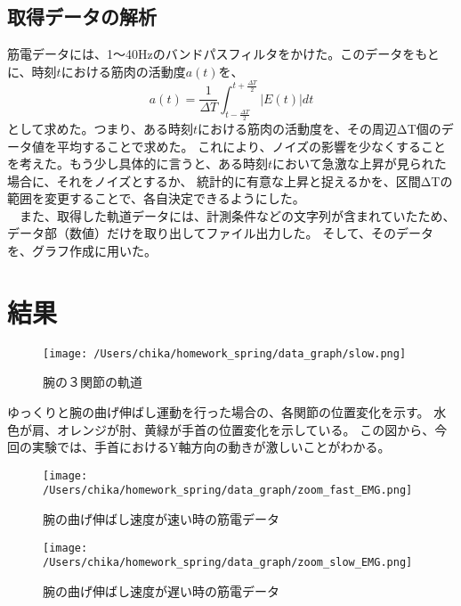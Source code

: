 \documentclass{jsarticle}
\begin{document}
\subsection{取得データの解析}
筋電データには、1〜40Hzのバンドパスフィルタをかけた。このデータをもとに、時刻$t$における筋肉の活動度$a(t)$を、
$$a(t) = \frac{1}{ΔT} \int_{t-\frac{ΔT}{2}}^{t+\frac{ΔT}{2}} |E(t)|dt $$
として求めた。つまり、ある時刻$t$における筋肉の活動度を、その周辺ΔT個のデータ値を平均することで求めた。
これにより、ノイズの影響を少なくすることを考えた。もう少し具体的に言うと、ある時刻$t$において急激な上昇が見られた場合に、それをノイズとするか、
統計的に有意な上昇と捉えるかを、区間ΔTの範囲を変更することで、各自決定できるようにした。\\
　また、取得した軌道データには、計測条件などの文字列が含まれていたため、データ部（数値）だけを取り出してファイル出力した。
そして、そのデータを、グラフ作成に用いた。

\clearpage
\section{結果}

\begin{figure}[h]
  \begin{center} %
    \texttt{[image: /Users/chika/homework\_spring/data\_graph/slow.png]}
    \caption{腕の３関節の軌道} %
    \label{kidou} %
  \end{center}
\end{figure}
ゆっくりと腕の曲げ伸ばし運動を行った場合の、各関節の位置変化を示す。
水色が肩、オレンジが肘、黄緑が手首の位置変化を示している。
この図から、今回の実験では、手首におけるY軸方向の動きが激しいことがわかる。

\begin{figure}[!h]
\begin{center}
\begin{minipage}[t]{0.49\textwidth}
\centering
\texttt{[image: /Users/chika/homework\_spring/data\_graph/zoom\_fast\_EMG.png]}
\caption{腕の曲げ伸ばし速度が速い時の筋電データ}
\label{fig1}
\end{minipage}
\hfill
\begin{minipage}[t]{0.49\textwidth}
\centering
\texttt{[image: /Users/chika/homework\_spring/data\_graph/zoom\_slow\_EMG.png]}
\caption{腕の曲げ伸ばし速度が遅い時の筋電データ}
\label{fig2}
\end{minipage}
\end{center}
\end{figure}
\end{document}
